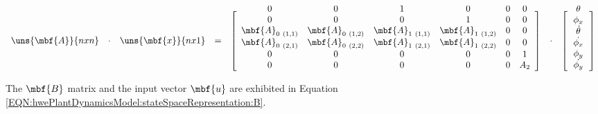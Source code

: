 \documentclass[crop=false,float=true,class=scrreprt]{standalone}
\begin{document}
\begin{equation}
\label{EQN:hwePlantDynamicsModel:stateSpaceRepresentation:A}
\begin{array}{ccccccc}
\uns{\mbf{A}}{n x n}
& \cdot &
\uns{\mbf{x}}{n x 1}
& = &
\begin{bmatrix}
\hphantom{v_{mtr.l}}\\[-2em]
\begin{array}{cccccc}
0 & 0 & 1 & 0 & 0 & 0 \\
0 & 0 & 0 & 1 & 0 & 0 \\
\mbf{A}_{0\ (1,1)} & \mbf{A}_{0\ (1,2)} & \mbf{A}_{1\ (1,1)} & \mbf{A}_{1\ (1,2)} & 0 & 0 \\
\mbf{A}_{0\ (2,1)} & \mbf{A}_{0\ (2,2)} & \mbf{A}_{1\ (2,1)} & \mbf{A}_{1\ (2,2)} & 0 & 0 \\
0 & 0 & 0 & 0 & 0 & 1     \\
0 & 0 & 0 & 0 & 0 & A_{2} \\
\end{array}
\end{bmatrix}
& \cdot &
\begin{bmatrix}
\hphantom{v_{mtr.l}}\\[-2em]
\theta         \\
\phi_{x}       \\
\dot{\theta}   \\
\dot{\phi_{x}} \\
\phi_{y}       \\
\dot{\phi_{y}} \\
\end{bmatrix}
\end{array}
\end{equation}


\vspace{-1em}




The $\mbf{B}$ matrix and the input vector $\mbf{u}$ are exhibited in Equation~%
\eqref{EQN:hwePlantDynamicsModel:stateSpaceRepresentation:B}.


\vspace{-1em}
\end{document}
